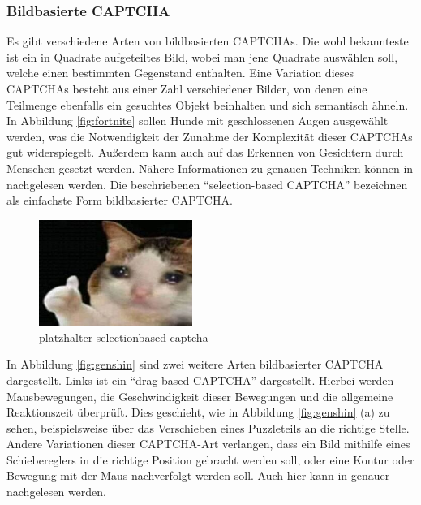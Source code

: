 \subsubsection*{Bildbasierte CAPTCHA}
Es gibt verschiedene Arten von bildbasierten CAPTCHAs. 
Die wohl bekannteste ist ein in Quadrate aufgeteiltes Bild, wobei man jene Quadrate auswählen soll, welche einen bestimmten Gegenstand enthalten.
Eine Variation dieses CAPTCHAs besteht aus einer Zahl verschiedener Bilder, von denen eine Teilmenge ebenfalls ein gesuchtes Objekt beinhalten 
und sich semantisch ähneln. 
In Abbildung \ref{fig:fortnite} sollen Hunde mit geschlossenen Augen ausgewählt werden,
was die Notwendigkeit der Zunahme der Komplexität dieser CAPTCHAs gut widerspiegelt. 
Außerdem kann auch auf das Erkennen von Gesichtern durch Menschen gesetzt werden.
Nähere Informationen zu genauen Techniken können in \cite[p.xx]{surveyofresearch} nachgelesen werden.
Die beschriebenen ``selection-based CAPTCHA'' bezeichnen \citeauthor{surveyofresearch} als einfachste Form bildbasierter CAPTCHA. \cite[p.77]{surveyofresearch}

\begin{figure}[h!]
    \centering\includegraphics[width=5cm]{gfx/mygraphics/platzhalter.png}
     \caption{platzhalter selectionbased captcha}
      \label{fig:selectionbased}
\end{figure}

In Abbildung \ref{fig:genshin} sind zwei weitere Arten bildbasierter CAPTCHA dargestellt.
Links ist ein ``drag-based CAPTCHA'' dargestellt.
Hierbei werden Mausbewegungen, die Geschwindigkeit dieser Bewegungen
und die allgemeine Reaktionszeit überprüft.
Dies geschieht, wie in Abbildung \ref{fig:genshin} (a) zu sehen,
beispielsweise über das Verschieben eines Puzzleteils an die richtige Stelle.
Andere Variationen dieser CAPTCHA-Art verlangen, dass ein Bild mithilfe eines Schiebereglers in die richtige Position gebracht werden soll,
oder eine Kontur oder Bewegung mit der Maus nachverfolgt werden soll.
Auch hier kann in \cite[p.77]{surveyofresearch} genauer nachgelesen werden.

